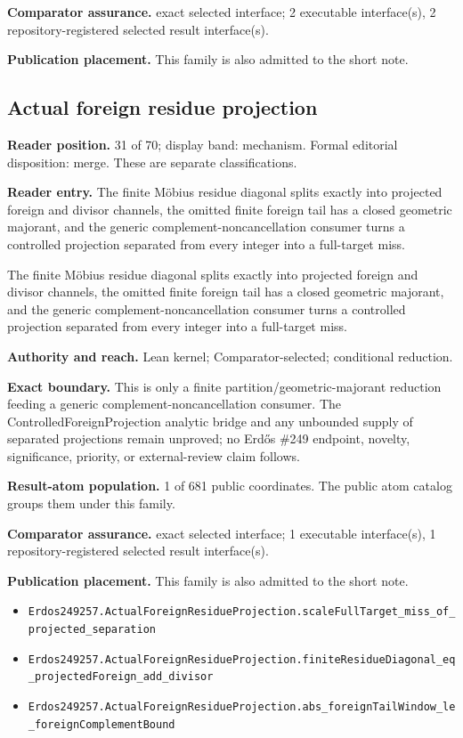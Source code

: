 \textbf{Comparator assurance.} exact selected interface; 2 executable interface(s), 2 repository-registered selected result interface(s).

\textbf{Publication placement.} This family is also admitted to the short note.

\subsection{Actual foreign residue projection}
\textbf{Reader position.} 31 of 70; display band: mechanism.  Formal editorial disposition: merge.  These are separate classifications.

\textbf{Reader entry.} The finite Möbius residue diagonal splits exactly into projected foreign and divisor channels, the omitted finite foreign tail has a closed geometric majorant, and the generic complement-noncancellation consumer turns a controlled projection separated from every integer into a full-target miss.

The finite Möbius residue diagonal splits exactly into projected foreign and divisor channels, the omitted finite foreign tail has a closed geometric majorant, and the generic complement-noncancellation consumer turns a controlled projection separated from every integer into a full-target miss.

\textbf{Authority and reach.} Lean kernel; Comparator-selected; conditional reduction.

\textbf{Exact boundary.} This is only a finite partition/geometric-majorant reduction feeding a generic complement-noncancellation consumer. The ControlledForeignProjection analytic bridge and any unbounded supply of separated projections remain unproved; no Erdős \#249 endpoint, novelty, significance, priority, or external-review claim follows.

\textbf{Result-atom population.} 1 of 681 public coordinates. The public atom catalog groups them under this family.

\textbf{Comparator assurance.} exact selected interface; 1 executable interface(s), 1 repository-registered selected result interface(s).

\textbf{Publication placement.} This family is also admitted to the short note.

\begin{itemize}
  \item \nolinkurl{Erdos249257.ActualForeignResidueProjection.scaleFullTarget_miss_of_projected_separation}
  \item \nolinkurl{Erdos249257.ActualForeignResidueProjection.finiteResidueDiagonal_eq_projectedForeign_add_divisor}
  \item \nolinkurl{Erdos249257.ActualForeignResidueProjection.abs_foreignTailWindow_le_foreignComplementBound}
\end{itemize}

